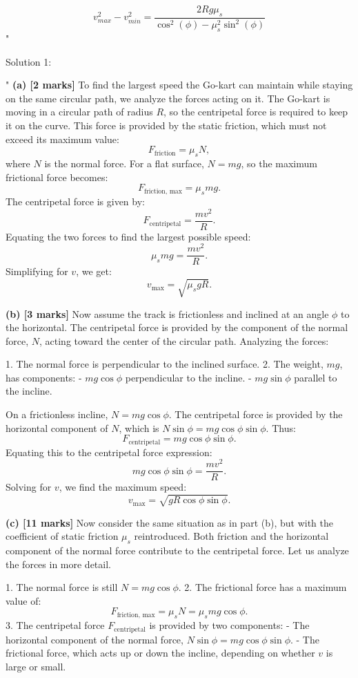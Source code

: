 \[ 
v_{max}^{2} - v_{min}^{2} = \frac{2Rg\mu_{s}}{\cos^{2}(\phi) - \mu_{s}^{2}\sin^{2}(\phi)}
\]"

Solution 1: 

"
\textbf{(a) [2 marks]}  
To find the largest speed the Go-kart can maintain while staying on the same circular path, we analyze the forces acting on it. The Go-kart is moving in a circular path of radius $R$, so the centripetal force is required to keep it on the curve. This force is provided by the static friction, which must not exceed its maximum value:
\[
F_{\text{friction}} = \mu_s N,
\]
where $N$ is the normal force. For a flat surface, $N = mg$, so the maximum frictional force becomes:
\[
F_{\text{friction, max}} = \mu_s mg.
\]
The centripetal force is given by:
\[
F_{\text{centripetal}} = \frac{mv^2}{R}.
\]
Equating the two forces to find the largest possible speed:
\[
\mu_s mg = \frac{mv^2}{R}.
\]
Simplifying for $v$, we get:
\[
v_{\text{max}} = \sqrt{\mu_s g R}.
\]

\textbf{(b) [3 marks]}  
Now assume the track is frictionless and inclined at an angle $\phi$ to the horizontal. The centripetal force is provided by the component of the normal force, $N$, acting toward the center of the circular path. Analyzing the forces:

1. The normal force is perpendicular to the inclined surface.
2. The weight, $mg$, has components:
   - $mg \cos\phi$ perpendicular to the incline.
   - $mg \sin\phi$ parallel to the incline.

On a frictionless incline, $N = mg \cos\phi$. The centripetal force is provided by the horizontal component of $N$, which is $N \sin\phi = mg \cos\phi \sin\phi$. Thus:
\[
F_{\text{centripetal}} = mg \cos\phi \sin\phi.
\]
Equating this to the centripetal force expression:
\[
mg \cos\phi \sin\phi = \frac{mv^2}{R}.
\]
Solving for $v$, we find the maximum speed:
\[
v_{\text{max}} = \sqrt{g R \cos\phi \sin\phi}.
\]

\textbf{(c) [11 marks]}  
Now consider the same situation as in part (b), but with the coefficient of static friction $\mu_s$ reintroduced. Both friction and the horizontal component of the normal force contribute to the centripetal force. Let us analyze the forces in more detail.

1. The normal force is still $N = mg \cos\phi$.
2. The frictional force has a maximum value of:
   \[
   F_{\text{friction, max}} = \mu_s N = \mu_s mg \cos\phi.
   \]
3. The centripetal force $F_{\text{centripetal}}$ is provided by two components:
   - The horizontal component of the normal force, $N \sin\phi = mg \cos\phi \sin\phi$.
   - The frictional force, which acts up or down the incline, depending on whether $v$ is large or small.

